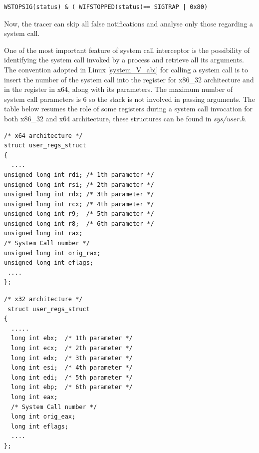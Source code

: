 \begin{center}
\lstset{escapechar=@,style=c}
\begin{lstlisting}[caption={Condition that identifies exclusively system call entry and exit}]
									WSTOPSIG(status) & ( WIFSTOPPED(status)== SIGTRAP | 0x80)
\end{lstlisting}
\end{center}

Now, the tracer can skip all false notifications and analyse only those regarding a system call. 

One of the most important feature of system call interceptor is the possibility of identifying the system call invoked by a process and retrieve all its arguments. The convention adopted in Linux \ref{system_V_abi} for calling a system call is to insert the number of the system call into the  register for x86\_32 architecture and in the  register in x64, along with its parameters. The maximum number of system call parameters is 6 so the stack is not involved in passing arguments. The table below resumes the role of some registers during a system call invocation for both x86\_32 and x64 architecture, these structures can be found in \emph{sys/user.h}. 

\begin{multicols}{2}

\begin{center}
\lstset{escapechar=@,style=c}
\begin{lstlisting}[caption={Linux structures representing the general purpose registers of x64 CPU}]
/* x64 architecture */				
struct user_regs_struct				
{                                 
  ....                                         
unsigned long int rdi; /* 1th parameter */
unsigned long int rsi; /* 2th parameter */		
unsigned long int rdx; /* 3th parameter */       
unsigned long int rcx; /* 4th parameter */   
unsigned long int r9;  /* 5th parameter */     		
unsigned long int r8;  /* 6th parameter */   
unsigned long int rax;  
/* System Call number */
unsigned long int orig_rax;			   
unsigned long int eflags;            
 ....   
};                                 
\end{lstlisting}
\end{center}

\begin{center}
\lstset{escapechar=@,style=c}
\begin{lstlisting}[caption={Linux structure representing the general purpose registers of x32 CPU}]
/* x32 architecture */				                                
 struct user_regs_struct
{
  .....
  long int ebx;	 /* 1th parameter */
  long int ecx;  /* 2th parameter */
  long int edx;  /* 3th parameter */
  long int esi;  /* 4th parameter */
  long int edi;  /* 5th parameter */
  long int ebp;  /* 6th parameter */
  long int eax;
  /* System Call number */
  long int orig_eax; 
  long int eflags;
  .... 
};                                 
\end{lstlisting}
\end{center}
\end{multicols}

